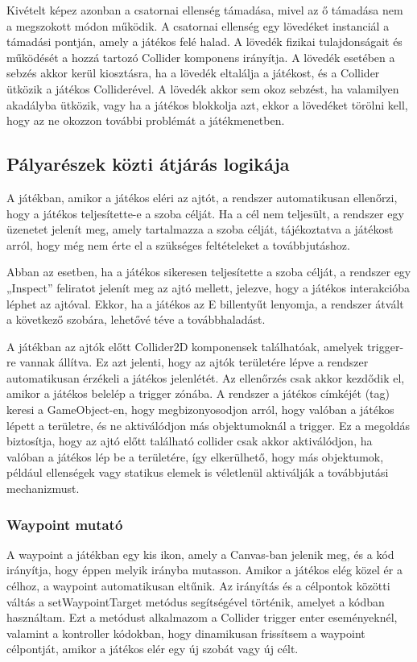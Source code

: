 \documentclass[
]{thesis-ekf}
\theoremstyle{definition}
\theoremstyle{remark}
\begin{document}
Kivételt képez azonban a csatornai ellenség támadása, mivel az ő támadása nem a megszokott módon működik. A csatornai ellenség egy lövedéket instanciál a támadási pontján, amely a játékos felé halad. A lövedék fizikai tulajdonságait és működését a hozzá tartozó Collider komponens irányítja. A lövedék esetében a sebzés akkor kerül kiosztásra, ha a lövedék eltalálja a játékost, és a Collider ütközik a játékos Colliderével. A lövedék akkor sem okoz sebzést, ha valamilyen akadályba ütközik, vagy ha a játékos blokkolja azt, ekkor a lövedéket törölni kell, hogy az ne okozzon további problémát a játékmenetben.
\subsection{Pályarészek közti átjárás logikája}
A játékban, amikor a játékos eléri az ajtót, a rendszer automatikusan ellenőrzi, hogy a játékos teljesítette-e a szoba célját. Ha a cél nem teljesült, a rendszer egy üzenetet jelenít meg, amely tartalmazza a szoba célját, tájékoztatva a játékost arról, hogy még nem érte el a szükséges feltételeket a továbbjutáshoz.

Abban az esetben, ha a játékos sikeresen teljesítette a szoba célját, a rendszer egy „Inspect” feliratot jelenít meg az ajtó mellett, jelezve, hogy a játékos interakcióba léphet az ajtóval. Ekkor, ha a játékos az E billentyűt lenyomja, a rendszer átvált a következő szobára, lehetővé téve a továbbhaladást.

A játékban az ajtók előtt Collider2D komponensek találhatóak, amelyek trigger-re vannak állítva. Ez azt jelenti, hogy az ajtók területére lépve a rendszer automatikusan érzékeli a játékos jelenlétét. Az ellenőrzés csak akkor kezdődik el, amikor a játékos belelép a trigger zónába. A rendszer a játékos címkéjét (tag) keresi a GameObject-en, hogy megbizonyosodjon arról, hogy valóban a játékos lépett a területre, és ne aktiválódjon más objektumoknál a trigger.
Ez a megoldás biztosítja, hogy az ajtó előtt található collider csak akkor aktiválódjon, ha valóban a játékos lép be a területére, így elkerülhető, hogy más objektumok, például ellenségek vagy statikus elemek is véletlenül aktiválják a továbbjutási mechanizmust.
\subsubsection{Waypoint mutató}
A waypoint a játékban egy kis ikon, amely a Canvas-ban jelenik meg, és a kód irányítja, hogy éppen melyik irányba mutasson. Amikor a játékos elég közel ér a célhoz, a waypoint automatikusan eltűnik. Az irányítás és a célpontok közötti váltás a setWaypointTarget metódus segítségével történik, amelyet a kódban használtam. Ezt a metódust alkalmazom a Collider trigger enter eseményeknél, valamint a kontroller kódokban, hogy dinamikusan frissítsem a waypoint célpontját, amikor a játékos elér egy új szobát vagy új célt.
\end{document}
